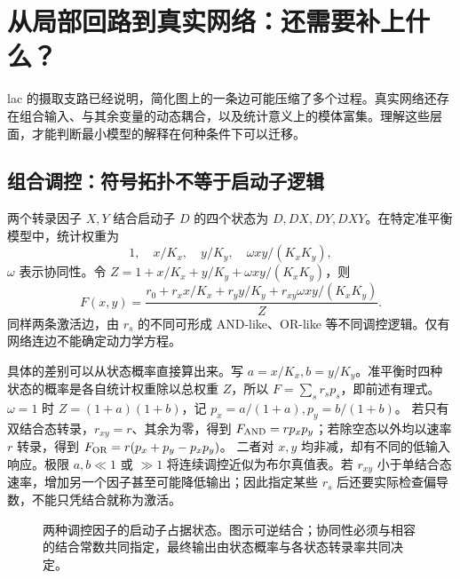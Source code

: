 \chapter{从局部回路到真实网络：还需要补上什么？}
lac 的摄取支路已经说明，简化图上的一条边可能压缩了多个过程。真实网络还存在组合输入、与其余变量的动态耦合，以及统计意义上的模体富集。理解这些层面，才能判断最小模型的解释在何种条件下可以迁移。
\section{组合调控：符号拓扑不等于启动子逻辑}
两个转录因子 $X,Y$ 结合启动子 $D$ 的四个状态为 $D,DX,DY,DXY$。在特定准平衡模型中，统计权重为
\begin{equation}1,\quad x/K_x,\quad y/K_y,\quad\omega xy/(K_xK_y),\end{equation}
$\omega$ 表示协同性。令 $Z=1+x/K_x+y/K_y+\omega xy/(K_xK_y)$，则
\begin{equation}F(x,y)=\frac{r_0+r_xx/K_x+r_yy/K_y+r_{xy}\omega xy/(K_xK_y)}{Z}.\end{equation}
同样两条激活边，由 $r_s$ 的不同可形成 AND-like、OR-like 等不同调控逻辑。仅有网络连边不能确定动力学方程。

具体的差别可以从状态概率直接算出来。写 $a=x/K_x,b=y/K_y$。准平衡时四种状态的概率是各自统计权重除以总权重 $Z$，所以 $F=\sum_s r_s p_s$，即前述有理式。$\omega=1$ 时 $Z=(1+a)(1+b)$，记 $p_x=a/(1+a),p_y=b/(1+b)$。
若只有双结合态转录，$r_{xy}=r$、其余为零，得到
$F_{\rm AND}=rp_xp_y$；若除空态以外均以速率 $r$ 转录，得到
$F_{\rm OR}=r(p_x+p_y-p_xp_y)$。
二者对 $x,y$ 均非减，却有不同的低输入响应。极限 $a,b\ll1$ 或 $\gg1$ 将连续调控近似为布尔真值表。若 $r_{xy}$ 小于单结合态速率，增加另一个因子甚至可能降低输出；因此指定某些 $r_s$ 后还要实际检查偏导数，不能只凭结合就称为激活。
\begin{figure}[H]\centering
{}
\caption{两种调控因子的启动子占据状态。图示可逆结合；协同性必须与相容的结合常数共同指定，最终输出由状态概率与各状态转录率共同决定。}
\end{figure}

